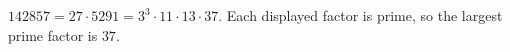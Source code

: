 $142857=27\cdot5291=3^3\cdot11\cdot13\cdot37$. Each displayed factor is prime, so the largest prime factor is $\boxed{37}$.
